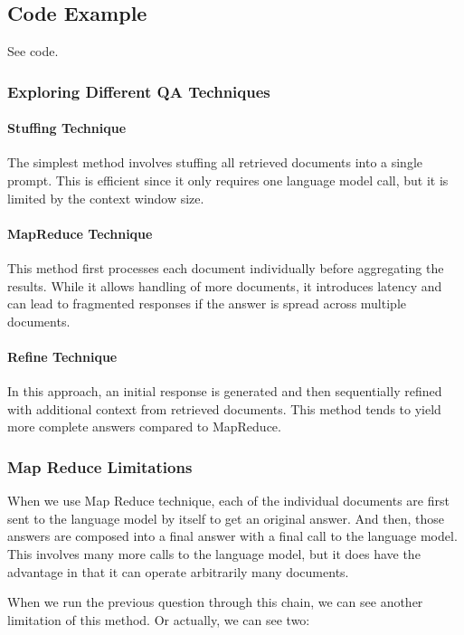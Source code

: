 \documentclass{article}
\begin{document}
\subsection{Code Example}

See code.

\subsubsection{Exploring Different QA Techniques}

\paragraph{Stuffing Technique} 
The simplest method involves stuffing all retrieved documents into a single prompt. This is efficient since it only requires one language model call, but it is limited by the context window size.

\paragraph{MapReduce Technique} 
This method first processes each document individually before aggregating the results. While it allows handling of more documents, it introduces latency and can lead to fragmented responses if the answer is spread across multiple documents.

\paragraph{Refine Technique} 
In this approach, an initial response is generated and then sequentially refined with additional context from retrieved documents. This method tends to yield more complete answers compared to MapReduce.

\subsubsection{Map Reduce Limitations}
When we use Map Reduce technique, each of the individual documents are first sent to the language model by itself to get an original answer. And then, those answers are composed into a final answer with a final call to the language model. This involves many more calls to the language model, but it does have the advantage in that it can operate arbitrarily many documents.

When we run the previous question through this chain, we can see another limitation of this method. Or actually, we can see two:
\end{document}
